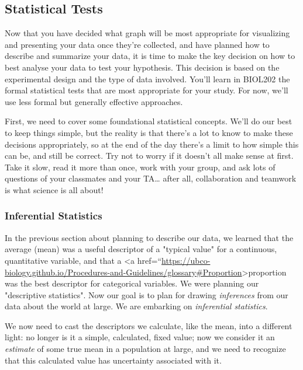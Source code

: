 \documentclass[
]{book}
\begin{document}
\hypertarget{statistical-tests}{%
\subsection*{Statistical Tests}\label{statistical-tests}}

Now that you have decided what graph will be most appropriate for visualizing and presenting your data once they're collected, and have planned how to describe and summarize your data, it is time to make the key decision on how to best analyse your data to test your hypothesis. This decision is based on the experimental design and the type of data involved. You'll learn in BIOL202 the formal statistical tests that are most appropriate for your study. For now, we'll use less formal but generally effective approaches.

First, we need to cover some foundational statistical concepts. We'll do our best to keep things simple, but the reality is that there's a lot to know to make these decisions appropriately, so at the end of the day there's a limit to how simple this can be, and still be correct. Try not to worry if it doesn't all make sense at first. Take it slow, read it more than once, work with your group, and ask lots of questions of your classmates and your TA\ldots{} after all, collaboration and teamwork is what science is all about!

\hypertarget{inferential-statistics}{%
\subsubsection*{Inferential Statistics}\label{inferential-statistics}}

In the previous section about planning to describe our data, we learned that the average (mean) was a useful descriptor of a "typical value" for a continuous, quantitative variable, and that a \textless a href=``\url{https://ubco-biology.github.io/Procedures-and-Guidelines/glossary\#Proportion}\textgreater proportion was the best descriptor for categorical variables. We were planning our "descriptive statistics". Now our goal is to plan for drawing \emph{inferences} from our data about the world at large. We are embarking on \emph{inferential statistics}.

We now need to cast the descriptors we calculate, like the mean, into a different light: no longer is it a simple, calculated, fixed value; now we consider it an \emph{estimate} of some true mean in a population at large, and we need to recognize that this calculated value has uncertainty associated with it.
\end{document}
